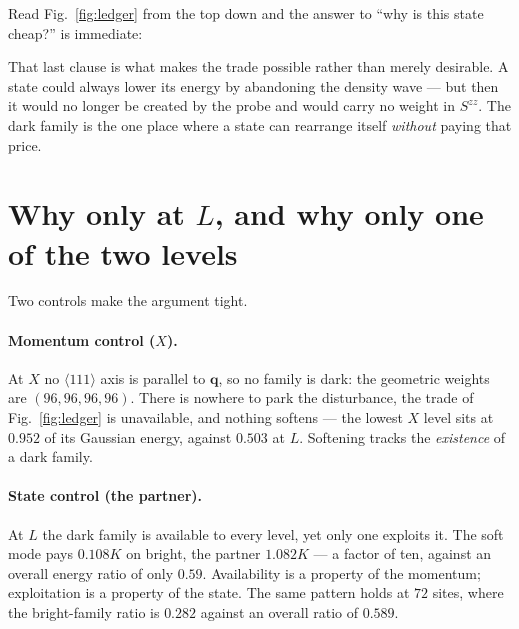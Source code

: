 \documentclass[11pt]{article}
\newcommand{\bq}{\bm q}
\begin{document}
\noindent
Read Fig.~\ref{fig:ledger} from the top down and the answer to ``why is
this state cheap?'' is immediate:

\begin{center}
\end{center}

\noindent
That last clause is what makes the trade possible rather than merely
desirable. A state could always lower its energy by abandoning the
density wave --- but then it would no longer be created by the probe and
would carry no weight in $S^{zz}$. The dark family is the one place
where a state can rearrange itself \emph{without} paying that price.

\section{Why only at \texorpdfstring{$L$}{L}, and why only one of the two levels}

Two controls make the argument tight.

\paragraph{Momentum control ($X$).} At $X$ no $\langle111\rangle$ axis is
parallel to $\bq$, so no family is dark: the geometric weights are
$(96,96,96,96)$. There is nowhere to park the disturbance, the trade of
Fig.~\ref{fig:ledger} is unavailable, and nothing softens --- the lowest
$X$ level sits at $0.952$ of its Gaussian energy, against $0.503$ at
$L$. Softening tracks the \emph{existence} of a dark family.

\paragraph{State control (the partner).} At $L$ the dark family is
available to every level, yet only one exploits it. The soft mode pays
$0.108K$ on bright, the partner $1.082K$ --- a factor of ten, against an
overall energy ratio of only $0.59$. Availability is a property of the
momentum; exploitation is a property of the state. The same pattern
holds at $72$ sites, where the bright-family ratio is $0.282$ against an
overall ratio of $0.589$.
\end{document}
